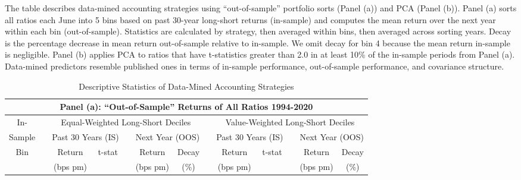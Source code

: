 \begin{table}[!h]
\caption{Descriptive Statistics of Data-Mined Accounting Strategies}
\label{tab:dm-oos}

\begin{singlespace}
\noindent The table describes data-mined accounting strategies using ``out-of-sample'' portfolio sorts (Panel (a)) and PCA (Panel (b)). Panel (a) sorts all ratios each June into 5 bins based on past 30-year long-short returns (in-sample) and computes the mean return over the next year within each bin (out-of-sample). Statistics are calculated by strategy, then averaged within bins, then averaged across sorting years. Decay is the percentage decrease in mean return out-of-sample relative to in-sample. We omit decay for bin 4 because the mean return in-sample is negligible.  Panel (b) applies PCA to ratios that have t-statistics greater than 2.0 in at least 10\% of the in-sample periods from Panel (a). Data-mined predictors resemble published ones in terms of in-sample performance, out-of-sample performance, and covariance structure.
\end{singlespace}
\begin{centering}
\vspace{-1ex}
\par\end{centering}
\centering{}\setlength{\tabcolsep}{0.9ex} \small
\begin{center}
\begin{tabular}{crrrrrrrrrrrr} \toprule 
\multicolumn{13}{c}{Panel (a): ``Out-of-Sample'' Returns of All Ratios 1994-2020} \\ 
\midrule
In- &   & \multicolumn{5}{c}{Equal-Weighted Long-Short Deciles} &   & \multicolumn{5}{c}{Value-Weighted Long-Short Deciles} 
\\ \cmidrule{3-7}\cmidrule{9-13}Sample &   & \multicolumn{2}{c}{Past 30 Years (IS)} &   & \multicolumn{2}{c}{Next Year (OOS)} &   & \multicolumn{2}{c}{Past 30 Years (IS)} &   & \multicolumn{2}{c}{Next Year (OOS)} \\ 
\cmidrule{3-4}\cmidrule{6-7}\cmidrule{9-10}\cmidrule{12-13}Bin &   & \multicolumn{1}{c}{Return} & \multicolumn{1}{c}{\multirow{2}[2]{*}{t-stat}} &   & \multicolumn{1}{c}{Return} & \multicolumn{1}{c}{Decay} &   & \multicolumn{1}{c}{Return} & \multicolumn{1}{c}{\multirow{2}[2]{*}{t-stat}} &   & \multicolumn{1}{c}{Return} & \multicolumn{1}{c}{Decay} \\ 
&   & \multicolumn{1}{c}{(bps pm)} &   &   & \multicolumn{1}{c}{(bps pm)} & \multicolumn{1}{c}{(\%)} &   & \multicolumn{1}{c}{(bps pm)} &   &   & \multicolumn{1}{c}{(bps pm)} & \multicolumn{1}{c}{(\%)} \\ 
\cmidrule{1-1}\cmidrule{3-4}\cmidrule{6-7}\cmidrule{9-10}\cmidrule{12-13}

\bottomrule \end{tabular}%
\vspace{2ex}

\setlength{\tabcolsep}{1.5ex}


\end{center} 
\end{table}

